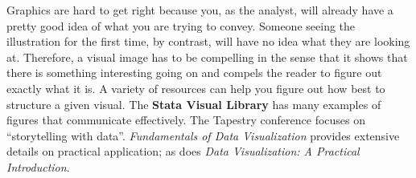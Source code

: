 Graphics are hard to get right because you, as the analyst,
will already have a pretty good idea of what you are trying to convey.
Someone seeing the illustration for the first time,
by contrast, will have no idea what they are looking at.
Therefore, a visual image has to be compelling in the sense
that it shows that there is something interesting going on
and compels the reader to figure out exactly what it is.
A variety of resources can help you
figure out how best to structure a given visual.
The \textbf{Stata Visual Library}
 has many examples of figures that communicate effectively.
The Tapestry conference focuses on ``storytelling with data''.
\textit{Fundamentals of Data Visualization} provides extensive details on practical application;
as does \textit{Data Visualization: A Practical Introduction}.




